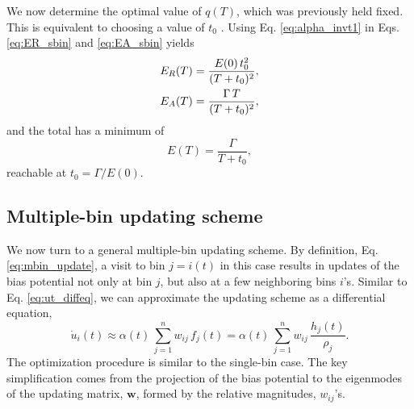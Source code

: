 \documentclass[reprint, superscriptaddress, floatfix]{revtex4-1}
\newcommand{\Err}{E}
\begin{document}
We now determine the optimal value of $q(T)$,
which was previously held fixed.
%
This is equivalent to choosing a value of $t_0$
\big[because $q(T) = \ln\bigl(1 + \frac{T}{t_0}\bigr)$,
from the $t = 0$ case of Eq. \eqref{eq:expqt}\big].
%
Using Eq. \eqref{eq:alpha_invt1} in
Eqs. \eqref{eq:ER_sbin} and \eqref{eq:EA_sbin}
yields
\begin{align}
  \Err_R(T)
  &= \frac{ \Err(0) \, t_0^2 } { (T + t_0)^2 }
  ,
  \notag
  \\
  \Err_A(T)
  &= \frac{ \Gamma \, T } { (T + t_0)^2 }
  ,
  \label{eq:EA_sbin1}
\end{align}
%
and the total has a minimum of
\begin{equation}
  \Err(T)
  =
  \frac{ \Gamma } { T + t_0 }
  ,
  \label{eq:Emin_sbin}
\end{equation}
%
reachable at $t_0 = \Gamma /\Err(0)$.
%
%



\subsection{\label{sec:multiple-bin}
Multiple-bin updating scheme}



We now turn to a general multiple-bin updating scheme.
%
By definition, Eq. \eqref{eq:mbin_update},
a visit to bin $j = i(t)$ in this case results in updates of the bias potential
not only at bin $j$, but also at a few neighboring bins $i$'s.
%
Similar to Eq. \eqref{eq:ut_diffeq},
we can approximate the updating scheme
as a differential equation,
%
\begin{equation}
  \dot u_i(t)
  \approx
  \alpha(t) \,
  \sum_{j=1}^n w_{ij} \, f_j(t)
  =
  \alpha(t) \,
  \sum_{j=1}^n w_{ij} \, \frac{ h_j(t) } { \rho_j }
  .
  \label{eq:ut_diffeq_mbin}
\end{equation}
%
The optimization procedure is similar to
the single-bin case.
%
The key simplification comes from the
projection of the bias potential to the eigenmodes
of the updating matrix, $\mathbf w$,
formed by the relative magnitudes, $w_{ij}$'s.
\end{document}
